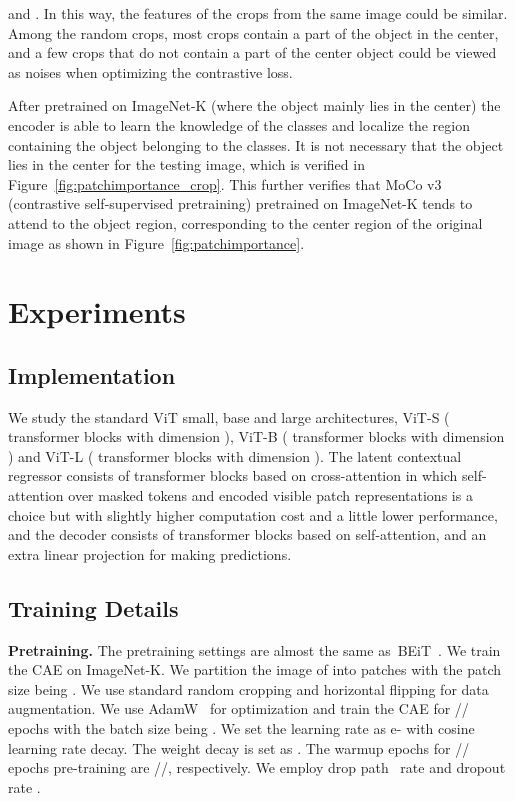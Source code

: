 \documentclass[twocolumn]{svjour3}          \smartqed  \usepackage{graphicx}
\begin{document}
and .
In this way, the features of the crops from the same image
could be similar.
Among the  random crops, 
most crops contain a part of the object in the center,
and a few crops that do not contain a part of the center object
could be viewed as noises
when optimizing the contrastive loss.

After pretrained on ImageNet-K
(where the object mainly lies in the center)
the encoder is able to learn the knowledge of the  classes
and localize the region containing the object belonging
to the  classes.
It is not necessary that
the object lies in the center for the testing image,
which is verified in Figure~\ref{fig:patchimportance_crop}.
This further verifies that
MoCo v3 (contrastive self-supervised pretraining)
pretrained on ImageNet-K
tends to attend to the object region,
corresponding to the center region of the original image as shown in Figure~\ref{fig:patchimportance}.







\section{Experiments}
\subsection{Implementation}
We study the standard ViT small, base and large architectures,
ViT-S ( transformer blocks with dimension ), ViT-B ( transformer blocks with dimension ) and ViT-L ( transformer blocks with dimension ). 
The latent contextual regressor
consists of  transformer blocks based on cross-attention
in which self-attention over masked tokens
and encoded visible patch representations
is a choice but with slightly higher computation cost and a little lower performance,
and the decoder consists of  transformer blocks based on self-attention,
and an extra linear projection
for making predictions.




\subsection{Training Details}
\label{sec:trainingdetails}

\noindent\textbf{Pretraining.}
The pretraining settings are almost the same as~BEiT~\cite{bao2021beit}.
We train the CAE
on ImageNet-K.
We partition the image 
of 
into  patches
with the patch size being . 
We use standard random cropping and horizontal flipping 
for data augmentation.
We use AdamW~\cite{loshchilov2017adamw} for optimization
and train the CAE for // epochs 
with the batch size being .
We set the learning rate 
as e-
with cosine learning rate decay.
The weight decay is set as . The warmup epochs for // epochs pre-training are //, respectively.
We employ drop path~\cite{huang2016stochastic_depth} rate  and dropout rate .
\end{document}

